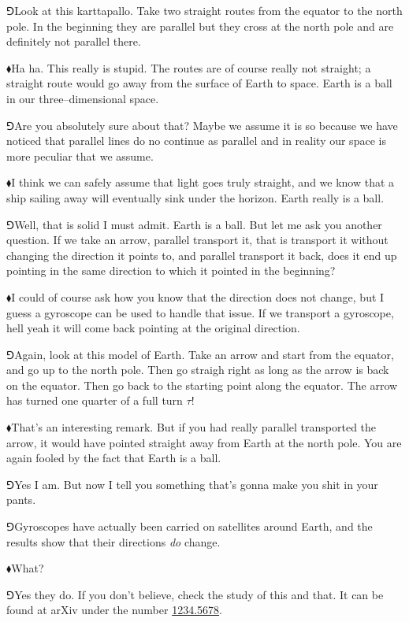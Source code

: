 \documentclass[10pt,oneside%
]{memoir}
\newcommand{\circc}{\tau}
\newcommand{\arxivreference}[1]{\url{#1}}
\newcommand{\hea}{\(\blacklozenge\)\;}
\newcommand{\heb}{\(\Game\)\;}
\begin{document}
\heb Look at this karttapallo. Take two straight routes from the equator to the north pole. In the beginning they are parallel but they cross at the north pole and are definitely not parallel there.

\hea Ha ha. This really is stupid. The routes are of course really not straight; a straight route would go away from the surface of Earth to space. Earth is a ball in our three--dimensional space.

\heb Are you absolutely sure about that? Maybe we assume it is so because we have noticed that parallel lines do no continue as parallel and in reality our space is more peculiar that we assume.

\hea I think we can safely assume that light goes truly straight, and we know that a ship sailing away will eventually sink under the horizon. Earth really is a ball.

\heb Well, that is solid I must admit. Earth is a ball. But let me ask you another question. If we take an arrow, parallel transport it, that is transport it without changing the direction it points to, and parallel transport it back, does it end up pointing in the same direction to which it pointed in the beginning?

\hea I could of course ask how you know that the direction does not change, but I guess a gyroscope can be used to handle that issue. If we transport a gyroscope, hell yeah it will come back pointing at the original direction.

\heb Again, look at this model of Earth. Take an arrow and start from the equator, and go up to the north pole. Then go straigh right as long as the arrow is back on the equator. Then go back to the starting point along the equator. The arrow has turned one quarter of a full turn \(\circc\)!

\hea That's an interesting remark. But if you had really parallel transported the arrow, it would have pointed straight away from Earth at the north pole. You are again fooled by the fact that Earth is a ball.

\heb Yes I am. But now I tell you something that's gonna make you shit in your pants.

\heb Gyroscopes have actually been carried on satellites around Earth, and the results show that their directions \emph{do} change.

\hea What?

\heb Yes they do. If you don't believe, check the study of this and that. It can be found at arXiv under the number \arxivreference{1234.5678}.
\end{document}
